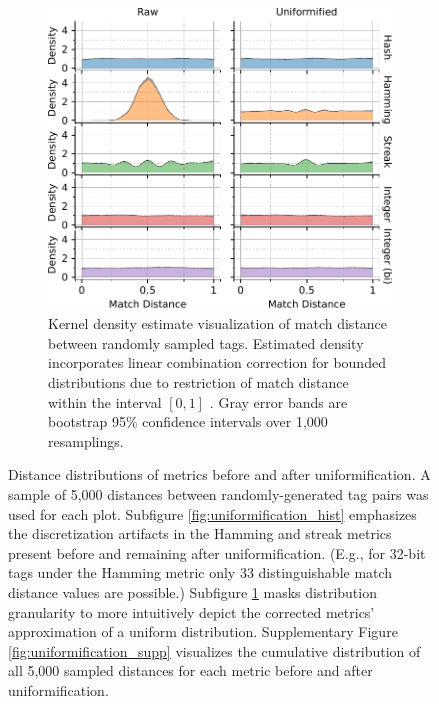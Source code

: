 \begin{figure}[!htbp]
\begin{center}
\begin{minipage}{\linewidth}
\begin{subfigure}[b]{\linewidth}
\begin{minipage}{0.75\textwidth}
\begin{center}
\includegraphics[width=\columnwidth]{img/uniformification/bitweight=0dot5+seed=1+title=low-score-distribution+viz=kde+_data_hathash_hash=75684cf1e73fb7f1+_script_fullcat_hash=73c1663bd9b49595+ext=}
\end{center}
\end{minipage}
\begin{minipage}{0.23\textwidth}
\caption{
Kernel density estimate visualization of match distance between randomly sampled tags.
Estimated density incorporates linear combination correction for bounded distributions due to restriction of match distance within the interval $[0,1]$ \citep{jones1993simple}.
Gray error bands are bootstrap 95\% confidence intervals over 1,000 resamplings.
}
\label{fig:uniformification_kde}
\end{minipage}
\end{subfigure}
\end{minipage}

\caption{
Distance distributions of metrics before and after uniformification.
A sample of 5,000 distances between randomly-generated tag pairs was used for each plot.
Subfigure \ref{fig:uniformification_hist} emphasizes the discretization artifacts in the Hamming and streak metrics present before and remaining after uniformification.
(E.g., for 32-bit tags under the Hamming metric only 33 distinguishable match distance values are possible.)
Subfigure \ref{fig:uniformification_kde} masks distribution granularity to more intuitively depict the corrected metrics' approximation of a uniform distribution.
Supplementary Figure \ref{fig:uniformification_supp} visualizes the cumulative distribution of all 5,000 sampled distances for each metric before and after uniformification.
}
\label{fig:uniformification}

\end{center}
\end{figure}


